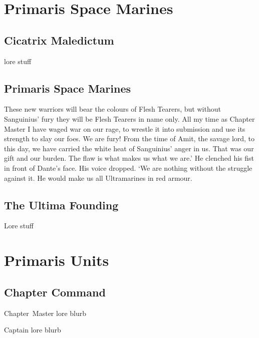 \documentclass[a4paper, twocolumn]{article}
\begin{document}

\section{Primaris Space Marines}

\subsection{Cicatrix Maledictum}
lore stuff

\subsection{Primaris Space Marines}
These new warriors will bear the colours of Flesh Tearers, but without Sanguinius’ fury they will be Flesh Tearers in name only. All my time as Chapter Master I have waged war on our rage, to wrestle it into submission and use its strength to slay our foes. We are fury! From the time of Amit, the savage lord, to this day, we have carried the white heat of Sanguinius’ anger in us. That was our gift and our burden. The flaw is what makes us what we are.’ 
He clenched his fist in front of Dante’s face. His voice dropped. ‘We are nothing without the struggle against it. He would make us all Ultramarines in red armour.

\subsection{The Ultima Founding}
Lore stuff


%
\clearpage \onecolumn
\section{Primaris Units}

\subsection{Chapter Command}

\unit{Chapter Master}{
  lore blurb
}
\statsEND


\unit{Captain}{
  lore blurb
}
\statsEND
\end{document}
